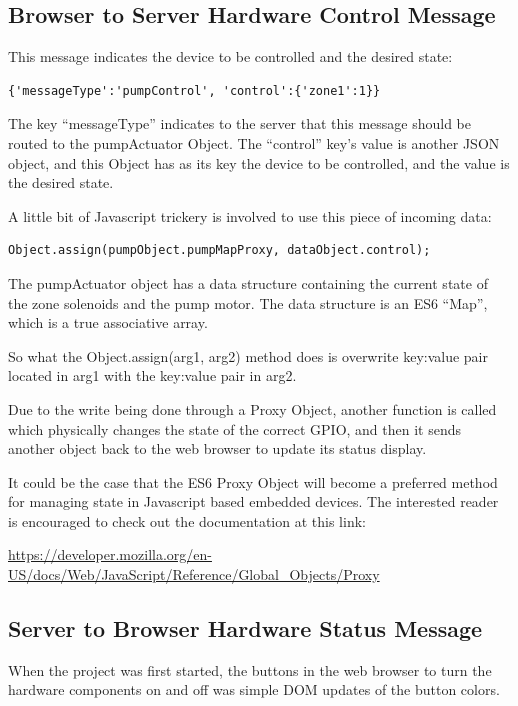 \subsection{Browser to Server Hardware Control Message}

This message indicates the device to be controlled and the desired state:

\begin{verbatim}
{'messageType':'pumpControl', 'control':{'zone1':1}}
\end{verbatim}

The key ``messageType'' indicates to the server that this message should be 
routed to the pumpActuator Object.  The ``control'' key's value is another JSON 
object, and this Object has as its key the device to be controlled, and the 
value is the desired state.

A little bit of Javascript trickery is involved to use this piece of incoming 
data:

\begin{verbatim}
Object.assign(pumpObject.pumpMapProxy, dataObject.control);
\end{verbatim}

The pumpActuator object has a data structure containing the current state of 
the zone solenoids and the pump motor.  The data structure is an ES6 ``Map'', 
which is a true associative array.

So what the Object.assign(arg1, arg2) method does is overwrite key:value pair 
located in arg1 with the key:value pair in arg2.

Due to the write being done through a Proxy Object, another function is called 
which physically changes the state of the correct GPIO, and then it sends 
another object back to the web browser to update its status display.

It could be the case that the ES6 Proxy Object will become a preferred method 
for managing state in Javascript based embedded devices.  The interested reader 
is encouraged to check out the documentation at this link:

\url{https://developer.mozilla.org/en-US/docs/Web/JavaScript/Reference/Global_Objects/Proxy}

\subsection{Server to Browser Hardware Status Message}

When the project was first started, the buttons in the web browser to turn the 
hardware components on and off was simple DOM updates of the button colors.


